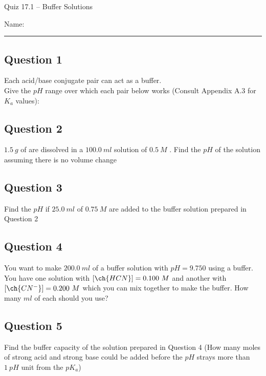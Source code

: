 \documentclass[11pt, letterpaper]{memoir}
\begin{document}
	\begin{center}
		{\large	Quiz 17.1 -- Buffer Solutions}
	\end{center}
	{\large Name: \rule[-1mm]{4in}{.1pt} 
	
	\subsection*{Question 1}
	Each acid/base conjugate pair can act as a buffer. \\Give the $pH$ range over which each pair below works (Consult Appendix A.3 for $K_a$ values):
	
	{\large {} \hspace{6em} \hspace{6em} \hspace{6em} }
	
	\vspace{2em}
	\subsection*{Question 2}
	$1.5~g$ of  are dissolved in a $100.0~ml$ solution of $0.5~M$ . Find the $pH$ of the solution assuming there is no volume change
	
	\vspace{6em}
	\subsection*{Question 3}
	Find the $pH$ if $25.0~ml$ of $0.75~M$  are added to the buffer solution prepared in Question 2
	
	\vspace{6em}
	\subsection*{Question 4}
	You want to make $200.0~ml$ of a buffer solution with $pH=9.750$ using a  buffer. You have one solution with $\left[\ch{HCN}\right]=0.100~M$ and another with $\left[\ch{CN^-}\right]=0.200~M$ which you can mix together to make the buffer. How many $ml$ of each should you use?
	
	\vspace{6em}
	\subsection*{Question 5}
	Find the buffer capacity of the solution prepared in Question 4 (How many moles of strong acid and strong base could be added before the $pH$ strays more than $1~pH$ unit from the $pK_a$)
	\newpage
	\pagestyle{empty}
	\addtocounter{page}{-1}
}
\end{document}

